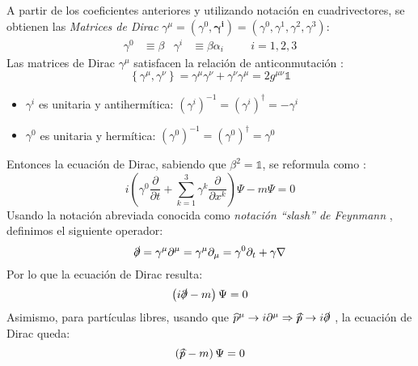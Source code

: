 A partir de los coeficientes anteriores y utilizando notación en cuadrivectores, se obtienen las \textit{Matrices de Dirac} $\gamma^{\mu}=(\gamma^0, \boldsymbol{\gamma^{i}})=(\gamma^0, \gamma^1, \gamma^2, \gamma^3)$:
\begin{align}
\gamma ^0 &\equiv \beta & \gamma ^i &\equiv \beta \alpha_i \hspace{1cm} i=1, 2, 3 \label{eq:matricesDirac}
\end{align}
Las matrices de Dirac $\gamma^{\mu}$ satisfacen la relación de anticonmutación \cite{MCR}:
\begin{equation}
\left\{ \gamma ^{\mu },\gamma ^{\nu }\right\} =\gamma ^{\mu }\gamma ^{\nu }+\gamma ^{\nu }\gamma ^{\mu }=2g^{\mu \nu }\mathbb{1}\label{eq:anticomm_relation}
\end{equation}
\begin{itemize}
\item $\gamma^{i}$ es unitaria y antihermítica: $\left( \gamma ^{i}\right) ^{-1}=\left( \gamma ^{i}\right) ^{\dagger}=-\gamma ^{i}$
\item $\gamma^{0}$ es unitaria y hermítica: $\left( \gamma ^{0}\right) ^{-1}=\left( \gamma ^{0}\right) ^{\dagger}=\gamma ^{0}$
\end{itemize}

Entonces la ecuación de Dirac, sabiendo que $\beta^2=\mathbb{1}$, se reformula como \cite{MCR}:
\begin{equation}
i\left( \gamma ^{0}\dfrac{\partial }{\partial t}+\sum ^{3}_{k=1}\gamma ^{k}\dfrac{\partial }{\partial x^{k}}\right) \Psi -m\Psi =0\label{eq:ecDirac_cov}
\end{equation}
Usando la notación abreviada conocida como \textit{notación ``slash'' de Feynmann} \cite{MCR}, definimos el siguiente operador:
\begin{equation*}
\slashed{\partial}=\gamma ^{\mu }\partial ^{\mu }=\gamma ^{\mu }\partial _{\mu }=\gamma ^{0}\partial _{t}+\gamma \nabla
\end{equation*}
Por lo que la ecuación de Dirac resulta:
\begin{equation}
\left(i \slashed{\partial}-m\right) \Psi =0\label{eq:Dirac_final}
\end{equation}
Asimismo, para partículas libres, usando que $\widehat{p}^{\mu} \rightarrow i\partial^{\mu} \Rightarrow \slashed{\widehat{p}} \rightarrow i\slashed{\partial}$ \cite{MCR}, la ecuación de Dirac queda:
\begin{equation}
\left( \slashed{\widehat{p}}-m\right) \Psi =0\label{eq:Dirac_free}
\end{equation}

